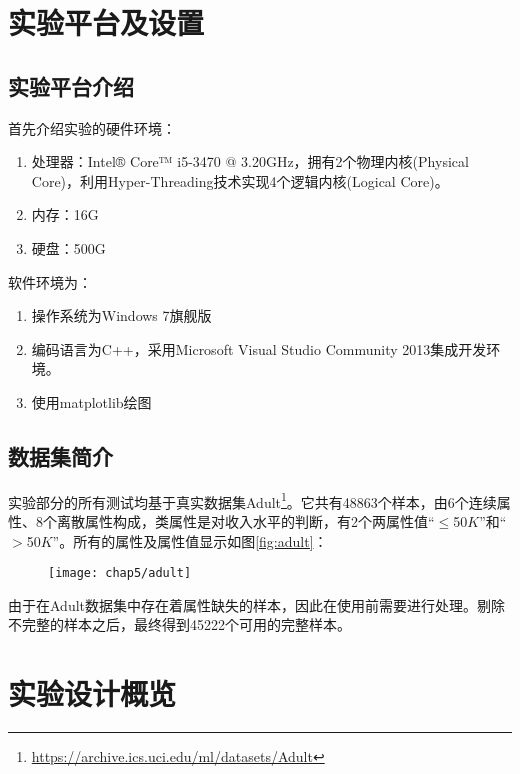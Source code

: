 \section{实验平台及设置}

\subsection{实验平台介绍}
首先介绍实验的硬件环境：
\begin{enumerate}
	\item 处理器：Intel® Core™ i5-3470 @ 3.20GHz，拥有2个物理内核(Physical Core)，利用Hyper-Threading技术实现4个逻辑内核(Logical Core)。
	\item 内存：16G
	\item 硬盘：500G
\end{enumerate}

软件环境为：
\begin{enumerate}
	\item 操作系统为Windows 7旗舰版
	\item 编码语言为C++，采用Microsoft Visual Studio Community 2013集成开发环境。
	\item 使用matplotlib绘图
\end{enumerate}

\subsection{数据集简介}

实验部分的所有测试均基于真实数据集Adult\footnote{\url{https://archive.ics.uci.edu/ml/datasets/Adult}}\cite{adult}。它共有48863个样本，由6个连续属性、8个离散属性构成，类属性是对收入水平的判断，有2个两属性值“$\leqslant$50$K$”和“$>$50$K$”。所有的属性及属性值显示如图\ref{fig:adult}：

\begin{figure}[!htp]
	\centering
	\texttt{[image: chap5/adult]}
\end{figure}

由于在Adult数据集中存在着属性缺失的样本，因此在使用前需要进行处理。剔除不完整的样本之后，最终得到45222个可用的完整样本。

\section{实验设计概览}

